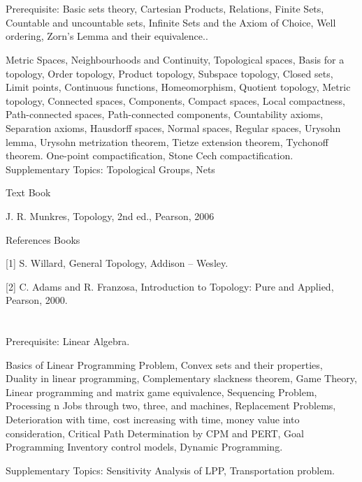 \section{\courseinfo}

Prerequisite: Basic sets theory, Cartesian Products, Relations, Finite Sets, Countable and uncountable sets, Infinite Sets and the Axiom of Choice, Well ordering, Zorn’s Lemma and their equivalence.. 

Metric Spaces, Neighbourhoods and Continuity, Topological spaces, Basis for a topology, Order topology, Product topology, Subspace topology, Closed sets, Limit points, Continuous functions, Homeomorphism, Quotient topology, Metric topology, Connected spaces, Components, Compact spaces, Local compactness, Path-connected spaces, Path-connected components, Countability axioms, Separation axioms, Hausdorff spaces, Normal spaces, Regular spaces, Urysohn lemma, Urysohn metrization theorem, Tietze extension theorem, Tychonoff theorem. One-point compactification, Stone Cech compactification.
Supplementary Topics: Topological Groups, Nets

Text Book

J. R. Munkres, Topology, 2nd ed., Pearson, 2006

References Books 

[1] S. Willard, General Topology, Addison – Wesley. 

[2] C. Adams and R. Franzosa, Introduction to Topology: Pure and Applied, Pearson, 2000.

\section{\courseinfo}

Prerequisite: Linear Algebra.  

Basics of Linear Programming Problem, Convex sets and their properties, Duality in linear programming, Complementary slackness theorem, Game Theory, Linear programming and matrix game equivalence, Sequencing Problem, Processing n Jobs through two, three, and machines, Replacement Problems, Deterioration with time, cost increasing with time, money value into consideration, Critical Path Determination by CPM and PERT, Goal Programming Inventory control models, Dynamic Programming.

Supplementary Topics: Sensitivity Analysis of LPP, Transportation problem.

